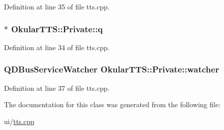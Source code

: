 Definition at line 35 of file tts.\+cpp.

\hypertarget{classOkularTTS_1_1Private_afd9d0ce678e2e78ac68b418980e584fa}{
\subsubsection[{q}]{$\ast$ Okular\+T\+T\+S\+::\+Private\+::q}}\label{classOkularTTS_1_1Private_afd9d0ce678e2e78ac68b418980e584fa}


Definition at line 34 of file tts.\+cpp.

\hypertarget{classOkularTTS_1_1Private_a7d356c1fac80113054138b07a96a6c74}{
\subsubsection[{watcher}]{\setlength{\rightskip}{0pt plus 5cm}Q\+D\+Bus\+Service\+Watcher Okular\+T\+T\+S\+::\+Private\+::watcher}}\label{classOkularTTS_1_1Private_a7d356c1fac80113054138b07a96a6c74}


Definition at line 37 of file tts.\+cpp.



The documentation for this class was generated from the following file\+:\begin{DoxyCompactItemize}
\item 
ui/\hyperlink{tts_8cpp}{tts.\+cpp}\end{DoxyCompactItemize}
